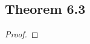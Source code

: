 \documentclass[../../main.tex]{subfiles}
\begin{document}
\subsection{Theorem 6.3}
\begin{wts}

\end{wts}
\begin{proof}

\end{proof}
\end{document}
